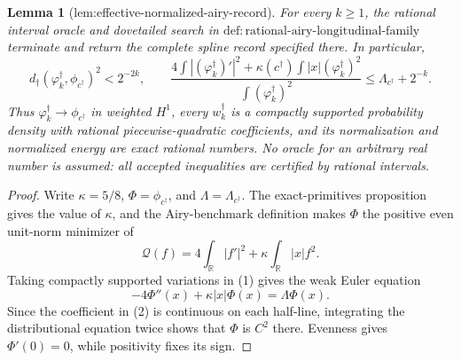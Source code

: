 \documentclass{article}
\newtheorem{lemma}{Lemma}
\begin{document}
{\begin{lemma}[lem:effective-normalized-airy-record]\label{lem:effective-normalized-airy-record}
For every \(k\ge1\), the rational interval oracle and dovetailed search in \(\mathrm{def:rational\text{-}airy\text{-}longitudinal\text{-}family}\) terminate and return the complete spline record specified there.  In particular,
\[
d_\dagger(\varphi_k^\dagger,\phi_{c^\dagger})^2<2^{-2k},
\qquad
\frac{4\int| (\varphi_k^\dagger)'|^2+
\kappa(c^\dagger)\int |x|(\varphi_k^\dagger)^2}
{\int(\varphi_k^\dagger)^2}
\le\Lambda_{c^\dagger}+2^{-k}.
\]
Thus \(\varphi_k^\dagger\to\phi_{c^\dagger}\) in weighted \(H^1\), every \(w_k^\dagger\) is a compactly supported probability density with rational piecewise-quadratic coefficients, and its normalization and normalized energy are exact rational numbers.  No oracle for an arbitrary real number is assumed: all accepted inequalities are certified by rational intervals.
\end{lemma}
\begin{proof}
Write \(\kappa=5/8\), \(\Phi=\phi_{c^\dagger}\), and \(\Lambda=\Lambda_{c^\dagger}\).  The exact-primitives proposition gives the value of \(\kappa\), and the Airy-benchmark definition makes \(\Phi\) the positive even unit-norm minimizer of
\[
\mathcal Q(f)=4\int_{\mathbb R}|f'|^2+
\kappa\int_{\mathbb R}|x|f^2. \tag{1}
\]
Taking compactly supported variations in (1) gives the weak Euler equation
\[
-4\Phi''(x)+\kappa|x|\Phi(x)=\Lambda\Phi(x). \tag{2}
\]
Since the coefficient in (2) is continuous on each half-line, integrating the distributional equation twice shows that \(\Phi\) is \(C^2\) there.  Evenness gives \(\Phi'(0)=0\), while positivity fixes its sign.


\end{proof}}
\end{document}
